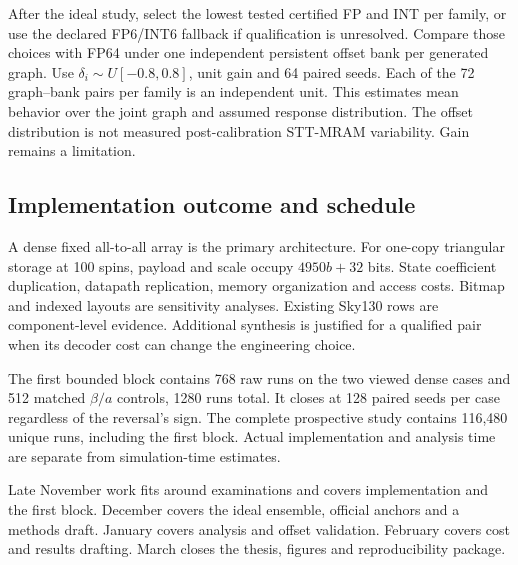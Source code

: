 After the ideal study, select the lowest tested certified FP and INT
per family, or use the declared FP6/INT6 fallback if qualification
is unresolved. Compare those choices with FP64 under one independent
persistent offset bank per generated graph. Use
$\delta_i\sim U[-0.8,0.8]$, unit gain and 64 paired seeds. Each of the
72 graph--bank pairs per family is an independent unit. This estimates
mean behavior over the joint graph and assumed response
distribution. The offset distribution is not measured
post-calibration STT-MRAM variability. Gain remains a limitation.

\subsection{Implementation outcome and schedule}
A dense fixed all-to-all array is the primary architecture.
For one-copy triangular storage at 100 spins, payload and scale
occupy $4950b+32$ bits. State coefficient duplication, datapath
replication, memory organization and access costs. Bitmap and
indexed layouts are sensitivity analyses. Existing Sky130 rows are
component-level evidence. Additional synthesis is justified for a
qualified pair when its decoder cost can change the engineering
choice.

The first bounded block contains 768 raw runs on the two viewed
dense cases and 512 matched $\beta/a$ controls, 1280 runs total.
It closes at 128 paired seeds per case regardless of the reversal's
sign. The complete prospective study contains 116,480 unique runs,
including the first block. Actual implementation and analysis time
are separate from simulation-time estimates.

Late November work fits around examinations and covers implementation
and the first block. December covers the ideal ensemble, official
anchors and a methods draft. January covers analysis and offset
validation. February covers cost and results drafting. March closes
the thesis, figures and reproducibility package.
